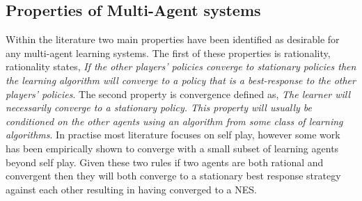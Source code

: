 \documentclass[conference]{IEEEtran}
\newcommand\katja[1]{{\color{dark-cyan}Katja: #1}}
\begin{document}
%

\subsection{Properties of Multi-Agent systems}

Within the literature two main properties have been identified as desirable for any multi-agent learning systems. The first of these properties is rationality\cite{bowling2002multiagent}, rationality states, \textit{If the other players' policies converge to stationary policies then the learning algorithm will converge to a policy that is a best-response to the other players' policies}. The second property is convergence defined as, \textit{The learner will necessarily converge to a stationary policy. This property will usually be conditioned on the other agents using an algorithm from some class of learning algorithms}. In practise most literature focuses on self play, however some work has been empirically shown to converge with a small subset of learning agents beyond self play\cite{bowling2002multiagent}. Given these two rules if two agents are both rational and convergent then they will both converge to a stationary best response strategy against each other resulting in having converged to a NES.
\end{document}
